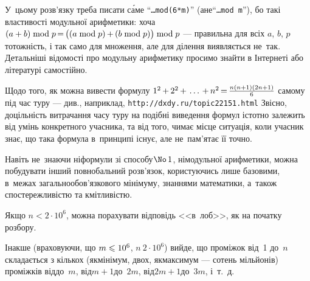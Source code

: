 \documentclass[14pt,a4paper]{extarticle}
\def\dib#1{\,#1\discretionary{}{\mbox{$#1$}}{}\,}
\begin{document}
У~цьому розв'язку треба писати с\'{а}ме ``\texttt{\dots\nolinebreak[3] mod\nolinebreak[3] \mbox{(6*m)}}'' (а\nolinebreak[2] не\nolinebreak[3] ``\texttt{\dots\nolinebreak[3] mod~m}''), бо такі властивості модульної арифметики: хоча ${(a+b)\bmod p} \dib{{=}} {\bigl((a\bmod p)}\dib{{+}}{(b\bmod p)\bigr)\bmod p}$ --- правильна для всіх $a$, $b$, $p$ тотожність, і так само для множення, але для ділення виявляється не~так. Детальніші відомості про модульну арифметику просимо знайти в Інтернеті або літературі самостійно.

Щодо того, як можна вивести формулу $1^2\dib{{+}}2^2\dib{{+}}\dots\dib{{+}}n^2\dib{{=}}\frac{n(n+1)(2n+1)}{6}$ самому під час туру --- див., наприклад, \verb"http://dxdy.ru/topic22151.html"\hspace{0.5em plus 1em} Звісно, доцільність витрачання часу туру на подібні виведення формул істотно залежить від умінь конкретного учасника, та від того, чи\nolinebreak[3] має місце ситуація, коли учасник знає, що така формула в~принципі існує, але не~пам'ятає її точно.


Навіть не~знаючи ні\nolinebreak[2] формули зі способу\nolinebreak[3] $\No\,1$, ні\nolinebreak[2] модульної арифметики, можна побудувати інший повнобальний розв'язок, користуючись лише базовими, в~межах загальнообов'язкового мінімуму, знаннями математики, а~також спостережливістю та кмітливістю.

Якщо $n < 2{\cdot}10^6$, можна порахувати відповідь <<в~лоб>>, як на початку розбору.

Інакше (враховуючи, що ${m\leqslant10^6}$, $n \> 2{\cdot}10^6$) вийде, що проміжок від~1 до~$n$ складається з кількох (як\nolinebreak[3] мінімум, двох, як\nolinebreak[3] максимум ---  сотень мільйонів) проміжків від\nolinebreak[2] до~$m$, від\nolinebreak[2] ${m{+}1}$\nolinebreak[2] до~$2m$, від\nolinebreak[2] ${2m{+}1}$\nolinebreak[2] до~$3m$, і~т.~д.

\vspace{0.375\baselineskip}

\end{document}
